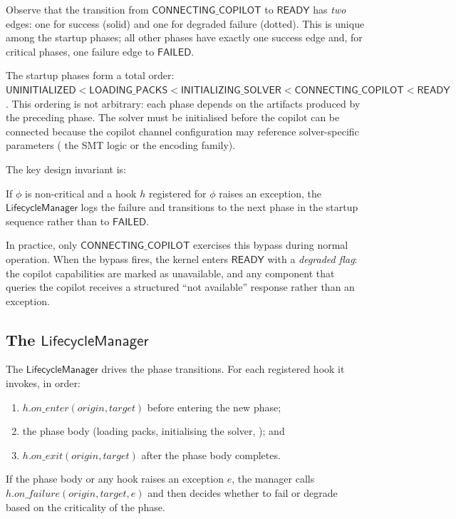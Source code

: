 \documentclass[11pt]{article}
\newcommand{\LM}{\mathsf{LifecycleManager}}
\newcommand{\UNINIT}{\mathsf{UNINITIALIZED}}
\newcommand{\LOADING}{\mathsf{LOADING\_PACKS}}
\newcommand{\INITSOLVER}{\mathsf{INITIALIZING\_SOLVER}}
\newcommand{\CONNECTING}{\mathsf{CONNECTING\_COPILOT}}
\newcommand{\READY}{\mathsf{READY}}
\newcommand{\FAILED}{\mathsf{FAILED}}
\begin{document}
Observe that the transition from $\CONNECTING$ to $\READY$ has
\emph{two} edges: one for success (solid) and one for degraded
failure (dotted).  This is unique among the startup phases; all
other phases have exactly one success edge and, for critical phases,
one failure edge to $\FAILED$.

\begin{remark}\label{rem:ordering}
The startup phases form a total order:
$\UNINIT < \LOADING < \INITSOLVER < \CONNECTING < \READY$.
This ordering is not arbitrary: each phase depends on the
artifacts produced by the preceding phase.  The solver must be
initialised before the copilot can be connected because the copilot
channel configuration may reference solver-specific parameters
(\eg{} the SMT logic or the encoding family).
\end{remark}

The key design invariant is:

\begin{proposition}\label{prop:bypass}
If $\phi$ is non-critical and a hook $h$ registered for $\phi$
raises an exception, the $\LM$ logs the failure and
transitions to the next phase in the startup sequence rather than
to $\FAILED$.
\end{proposition}

In practice, only $\CONNECTING$ exercises this bypass
during normal operation.  When the bypass fires, the kernel enters
$\READY$ with a \emph{degraded flag}: the copilot capabilities
are marked as unavailable, and any component that queries the
copilot receives a structured ``not available'' response rather than
an exception.

\subsection{The \texorpdfstring{$\LM$}{LifecycleManager}}

The $\LM$ drives the phase transitions.  For each
registered hook it invokes, in order:
\begin{enumerate}
  \item $h.\mathit{on\_enter}(\mathit{origin}, \mathit{target})$
        before entering the new phase;
  \item the phase body (loading packs, initialising the solver,
        \etc{}); and
  \item $h.\mathit{on\_exit}(\mathit{origin}, \mathit{target})$
        after the phase body completes.
\end{enumerate}
If the phase body or any hook raises an exception $e$, the manager
calls $h.\mathit{on\_failure}(\mathit{origin}, \mathit{target}, e)$
and then decides whether to fail or degrade based on the criticality
of the phase.
\end{document}

